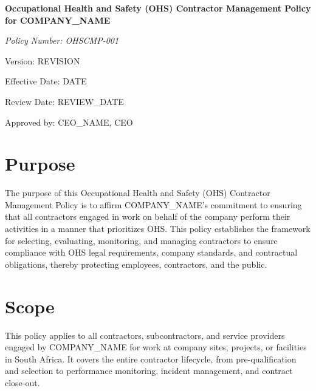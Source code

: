\documentclass[12pt]{article}
\begin{document}
\begin{titlepage}
    \centering
    \vspace*{2cm}
    {\LARGE\bfseries Occupational Health and Safety (OHS) Contractor Management Policy for {{COMPANY_NAME}}\par}
    \vspace{1cm}
    {\large\itshape Policy Number: OHSCMP-001\par}
    \vspace{0.5cm}
    {\normalsize Version: {{REVISION}}\par}
    \vspace{0.5cm}
    {\normalsize Effective Date: {{DATE}}\par}
    \vspace{0.5cm}
    {\normalsize Review Date: {{REVIEW_DATE}}\par}
    \vspace{2cm}
    {\normalsize Approved by: {{CEO_NAME}}, CEO\par}
\end{titlepage}

\section{Purpose}
The purpose of this Occupational Health and Safety (OHS) Contractor Management Policy is to affirm {{COMPANY_NAME}}'s commitment to ensuring that all contractors engaged in work on behalf of the company perform their activities in a manner that prioritizes OHS. This policy establishes the framework for selecting, evaluating, monitoring, and managing contractors to ensure compliance with OHS legal requirements, company standards, and contractual obligations, thereby protecting employees, contractors, and the public.

\section{Scope}
This policy applies to all contractors, subcontractors, and service providers engaged by {{COMPANY_NAME}} for work at company sites, projects, or facilities in South Africa. It covers the entire contractor lifecycle, from pre-qualification and selection to performance monitoring, incident management, and contract close-out.
\end{document}

